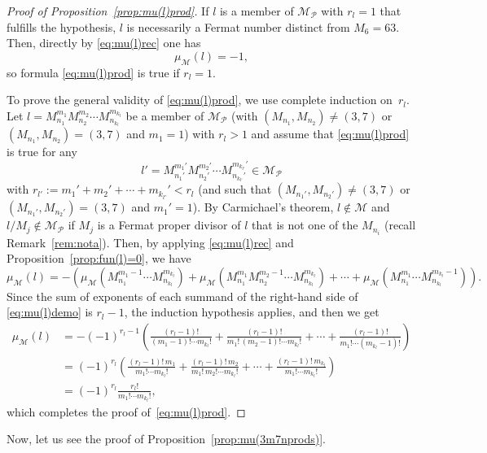 \documentclass[11pt, a4paper]{article}
\newcommand{\calM}{\mathcal{M}}
\newcommand{\muM}{\mu_\calM}
\newcommand{\Mp}{\calM_{\mathcal{P}}}
\theoremstyle{plain}
\theoremstyle{definition}
\begin{document}
\begin{proof}[Proof of Proposition~\ref{prop:mu(l)prod}]
If $l$ is a member of $\Mp$ with $r_l=1$ that fulfills the hypothesis, 
$l$ is necessarily a Fermat number distinct from $M_{6}=63$.
Then, directly by \eqref{eq:mu(l)rec} one has 
\[
  \muM(l) = -1, 
\]
so formula \eqref{eq:mu(l)prod} is true if $r_l=1$. 

To prove the general validity of \eqref{eq:mu(l)prod}, we use complete induction on~$r_l$. 
Let $l = M_{n_1}^{m_1} M_{n_2}^{m_2} \cdots M_{n_{k_l}}^{m_{k_l}}$ be a member of $\Mp$ 
(with $(M_{n_1},M_{n_2}) \ne (3,7)$ or $(M_{n_1},M_{n_2})=(3,7)$ and $m_1=1$)
with $r_l>1$ and assume that \eqref{eq:mu(l)prod} is true for any 
\[
  l' = M_{n_1'}^{m_1'} M_{n_2'}^{m_2'} 
  \cdots M_{n_{k_{l'}}'}^{m_{k_{l'}}'} \in \Mp
\]
with 
$r_{l'} := m_1' + m_2' + \cdots + m_{k_{l'}}' < r_l$
(and such that $(M_{n_1'},M_{n_2'}) \ne (3,7)$ or $(M_{n_1'},M_{n_2'}) = (3,7)$ and $m_1'=1$).
By Carmichael's theorem, $l\notin \calM$ and $l/M_j \notin \Mp$ 
if $M_j$ is a Fermat proper divisor of $l$ that is not one of the $M_{n_{i}}$
(recall Remark~\ref{rem:nota}).
Then, by applying \eqref{eq:mu(l)rec} and Proposition~\ref{prop:fun(l)=0}, we have 
\begin{equation}
\label{eq:mu(l)demo}
  \muM(l) = -\left(  \muM(M_{n_1}^{m_1-1} \cdots M_{n_{k_l}}^{m_{k_l}})
  + \muM(M_{n_1}^{m_1}M_{n_2}^{m_2-1} \cdots M_{n_{k_l}}^{m_{k_l}})
  + \cdots + \muM(M_{n_1}^{m_1} \cdots M_{n_{k_l}}^{m_{k_l}-1}) \right) .
\end{equation}
Since the sum of exponents of each summand of the right-hand side of \eqref{eq:mu(l)demo}
is $r_l-1$, the induction hypothesis applies, and then we get 
\begin{align*}
  \muM(l) &= -(-1)^{r_l-1} 
  \left( \frac{(r_l-1)!}{(m_1-1)! \cdots m_{k_l}!} 
  + \frac{(r_l-1)!}{m_1!\,(m_2-1)! \cdots m_{k_l}!} + \cdots 
  + \frac{(r_l-1)!}{m_1! \cdots (m_{k_l}-1)!} \right) \\
  &= (-1)^{r_l}
  \left( \frac{(r_l-1)!\,m_1}{m_1! \cdots m_{k_l}!} 
  + \frac{(r_l-1)!\,m_2}{m_1!\,m_2! \cdots m_{k_l}!} + \cdots 
  + \frac{(r_l-1)!\,m_{k_l}}{m_1! \cdots m_{k_l}!} \right) \\
  &= (-1)^{r_l} \frac{r_l!}{m_1! \cdots m_{k_l}!}, 
\end{align*}
which completes the proof of~\eqref{eq:mu(l)prod}. 
\end{proof}

Now, let us see the proof of Proposition~\ref{prop:mu(3m7nprods)}.
\end{document}
